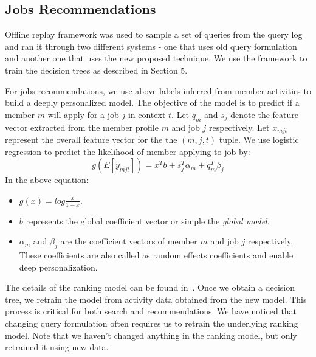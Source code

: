 
\subsection{Jobs Recommendations}


Offline replay framework was used to sample a set of queries from the query
log and ran it through two different systems - one that uses old query
formulation and another one that uses the new proposed technique. 
We use the framework to train the decision trees as described in Section 5.  

For jobs recommendations, we use above labels inferred from member activities 
to build a deeply personalized
model. The objective of the model is to predict if a member $m$ will apply for
a job $j$ in context $t$. Let $q_m$ and $s_j$ denote the feature vector 
extracted from the member profile $m$ and job $j$ respectively. Let $x_{mjt}$
represent the overall feature vector for the the $(m, j, t)$ tuple. We use
logistic regression to predict the likelihood of member applying to job by:
\begin{equation} \label{eqn:glmix}
    g(E[y_{mjt}]) = x^{T}b + s^{T}_{j}\alpha_{m} + q^{T}_{m}\beta_{j}
\end{equation}
In the above equation:
\begin{itemize}
        \item $g(x) = log\frac{x}{1-x}$.
        \item  $b$ represents the global coefficient vector or simple the {\it
            global model}.
        \item $\alpha_m$ and $\beta_j$ are the coefficient vectors of member
            $m$ and job $j$ respectively. These coefficients are also called as
            random effects coefficients and enable deep personalization.

\end{itemize}
The details of the ranking model can be found in~\cite{zhang2016glmix}. Once we
obtain a decision tree, we retrain the model from activity data obtained from
the new model. This process is critical for both search and recommendations. We
have noticed that changing query formulation often requires us to retrain the
underlying ranking model. Note that we haven't changed anything in the ranking
model, but only retrained it using new data.

